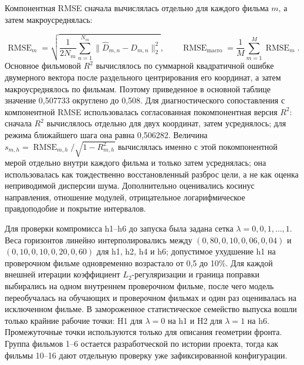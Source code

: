 \documentclass[11pt,a4paper]{article}
\begin{document}
Компонентная RMSE сначала вычислялась отдельно для каждого фильма $m$, а затем макроусреднялась:

\begin{equation}
\operatorname{RMSE}_m=
\sqrt{\frac{1}{2N_m}\sum_{n=1}^{N_m}
\|\widehat D_{m,n}-D_{m,n}\|^2_2},
\qquad
\operatorname{RMSE}_{\mathrm{macro}}
=\frac{1}{M}\sum_{m=1}^{M}\operatorname{RMSE}_m.
\end{equation}
Основное фильмовой $R^2$ вычислялось по суммарной квадратичной ошибке двумерного вектора после раздельного центрирования его координат, а затем макроусреднялось по фильмам. Поэтому приведенное в основной таблице значение 0,507733 округлено до 0,508. Для диагностического сопоставления с компонентной RMSE использовалась согласованная покомпонентная версия $R^2$: сначала $R^2$ вычислялось отдельно для двух координат, затем усреднялось; для режима ближайшего шага она равна 0,506282. Величина $s_{m,h}=\operatorname{RMSE}_{m,h}/\sqrt{1-R^2_{m,h}}$ вычислялась именно с этой покомпонентной мерой отдельно внутри каждого фильма и только затем усреднялась; она использовалась как тождественно восстановленный разброс цели, а не как оценка неприводимой дисперсии шума. Дополнительно оценивались косинус направления, отношение модулей, отрицательное логарифмическое правдоподобие и покрытие интервалов.

Для проверки компромисса h1--h6 до запуска была задана сетка $\lambda=0,0{,}1,\ldots,1$. Веса горизонтов линейно интерполировались между $(0{,}80,0{,}10,0{,}06,0{,}04)$ и $(0{,}10,0{,}10,0{,}20,0{,}60)$ для h1, h2, h4 и h6; допустимое ухудшение h1 на проверочном фильме одновременно возрастало от 0,5 до 10\%. Для каждой внешней итерации коэффициент $L_2$-регуляризации и граница поправки выбирались на одном внутреннем проверочном фильме, после чего модель переобучалась на обучающих и проверочном фильмах и один раз оценивалась на исключенном фильме. В замороженное статистическое семейство выпуска вошли только крайние рабочие точки: H1 для $\lambda=0$ на h1 и H2 для $\lambda=1$ на h6. Промежуточные точки используются только для описания геометрии фронта. Группа фильмов 1--6 остается разработческой по истории проекта, тогда как фильмы 10--16 дают отдельную проверку уже зафиксированной конфигурации.
\end{document}
